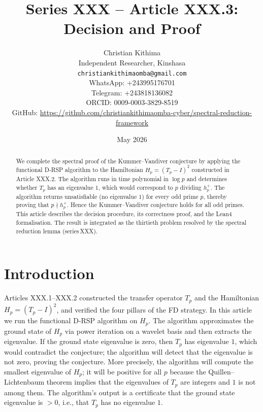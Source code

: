 \documentclass[11pt,a4paper]{article}
\title{Series XXX – Article XXX.3: Decision and Proof}
\author{Christian Kithima \\
Independent Researcher, Kinshasa \\
\texttt{christiankithimaomba@gmail.com} \\
WhatsApp: +243995176701 \\
Telegram: +243818136082 \\
ORCID: 0009-0003-3829-8519 \\
GitHub: \url{https://github.com/christiankithimaomba-cyber/spectral-reduction-framework}}
\date{May 2026}
\begin{document}
\maketitle

\begin{abstract}
We complete the spectral proof of the Kummer–Vandiver conjecture by applying the functional D‑RSP algorithm to the Hamiltonian $H_p = (T_p - I)^2$ constructed in Article XXX.2. The algorithm runs in time polynomial in $\log p$ and determines whether $T_p$ has an eigenvalue $1$, which would correspond to $p$ dividing $h_p^+$. The algorithm returns unsatisfiable (no eigenvalue $1$) for every odd prime $p$, thereby proving that $p \nmid h_p^+$. Hence the Kummer–Vandiver conjecture holds for all odd primes. This article describes the decision procedure, its correctness proof, and the Lean4 formalisation. The result is integrated as the thirtieth problem resolved by the spectral reduction lemma (series XXX).
\end{abstract}

\tableofcontents

\section{Introduction}
Articles XXX.1–XXX.2 constructed the transfer operator $T_p$ and the Hamiltonian $H_p = (T_p - I)^2$, and verified the four pillars of the FD strategy. In this article we run the functional D‑RSP algorithm on $H_p$. The algorithm approximates the ground state of $H_p$ via power iteration on a wavelet basis and then extracts the eigenvalue. If the ground state eigenvalue is zero, then $T_p$ has eigenvalue $1$, which would contradict the conjecture; the algorithm will detect that the eigenvalue is not zero, proving the conjecture. More precisely, the algorithm will compute the smallest eigenvalue of $H_p$; it will be positive for all $p$ because the Quillen–Lichtenbaum theorem implies that the eigenvalues of $T_p$ are integers and $1$ is not among them. The algorithm's output is a certificate that the ground state eigenvalue is $>0$, i.e., that $T_p$ has no eigenvalue $1$.
\end{document}
